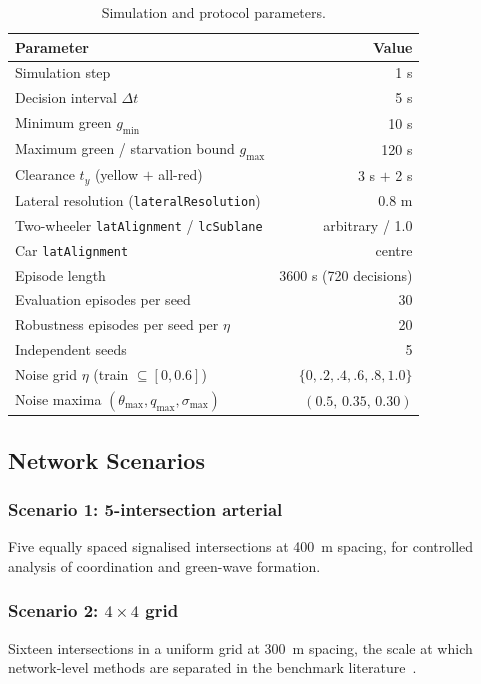 \documentclass[journal]{IEEEtran}
\begin{document}
\begin{table}[htbp]
\caption{Simulation and protocol parameters.}
\label{tab:simparams}
\centering
\footnotesize
\begin{tabularx}{\columnwidth}{@{}Xr@{}}
\toprule
Parameter & Value \\
\midrule
Simulation step & 1 s \\
Decision interval $\Delta t$ & 5 s \\
Minimum green $g_{\min}$ & 10 s \\
Maximum green / starvation bound $g_{\max}$ & 120 s \\
Clearance $t_y$ (yellow $+$ all-red) & 3 s $+$ 2 s \\
Lateral resolution (\texttt{lateralResolution}) & 0.8 m \\
Two-wheeler \texttt{latAlignment} / \texttt{lcSublane} & arbitrary / 1.0 \\
Car \texttt{latAlignment} & centre \\
Episode length & 3600 s (720 decisions) \\
Evaluation episodes per seed & 30 \\
Robustness episodes per seed per $\eta$ & 20 \\
Independent seeds & 5 \\
Noise grid $\eta$ (train $\subseteq [0,0.6]$) & $\{0,.2,.4,.6,.8,1.0\}$ \\
Noise maxima $(\theta_{\max},q_{\max},\sigma_{\max})$ & $(0.5,\,0.35,\,0.30)$ \\
\bottomrule
\end{tabularx}
\end{table}

\subsection{Network Scenarios}
\label{subsec:scenarios}
\subsubsection{Scenario 1: 5-intersection arterial}
Five equally spaced signalised intersections at 400~m spacing, for
controlled analysis of coordination and green-wave formation.

\subsubsection{Scenario 2: $4\times4$ grid}
Sixteen intersections in a uniform grid at 300~m spacing, the scale at
which network-level methods are separated in the benchmark
literature~\cite{b_mplight,b_advxlight}.
\end{document}
